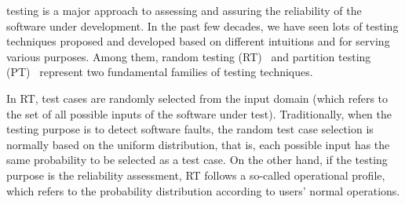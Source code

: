 \documentclass[10pt,journal,compsoc]{IEEEtran}
\begin{document}
\maketitle


\IEEEdisplaynontitleabstractindextext



%
\IEEEpeerreviewmaketitle




 testing is a major approach to assessing and assuring the reliability of the software under development. In the past few decades, we have seen lots of testing techniques proposed and developed based on different intuitions and for serving various purposes. Among them, random testing (RT)~\cite{Hamlet02} and partition testing (PT)~\cite{Weyuker91} represent two fundamental families of testing techniques.

In RT, test cases are randomly selected from the input domain (which refers to the set of all possible inputs of the software under test). Traditionally, when the testing purpose is to detect software faults, the random test case selection is normally based on the uniform distribution, that is, each possible input has the same probability to be selected as a test case. On the other hand, if the testing purpose is the reliability assessment, RT follows a so-called operational profile, which refers to the probability distribution according to users' normal operations.
\end{document}
